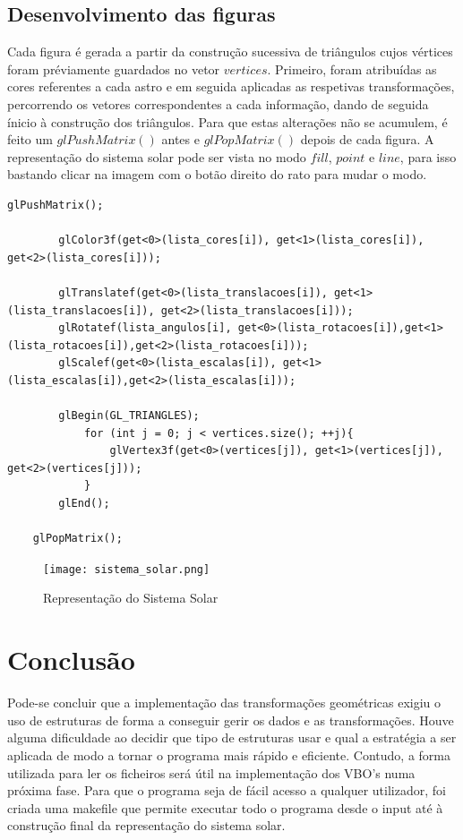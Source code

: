 \documentclass{report}
\begin{document}
\section{Desenvolvimento das figuras}
Cada figura \'e gerada a partir da constru\c{c}\~ao sucessiva de tri\^angulos cujos v\'ertices foram pr\'eviamente guardados no vetor $vertices$. Primeiro, foram atribu\'idas as cores referentes a cada astro e em seguida aplicadas as respetivas transforma\c{c}\~oes, percorrendo os vetores correspondentes a cada informa\c{c}\~ao, dando de seguida \'inicio \`a constru\c{c}\~ao dos tri\^angulos.
Para que estas altera\c{c}\~oes n\~ao se acumulem, \'e feito um $glPushMatrix()$ antes e $glPopMatrix()$ depois de cada figura.
A representa\c{c}\~ao do sistema solar pode ser vista no modo $fill$, $point$ e $line$, para isso bastando clicar na imagem com o bot\~ao direito do rato para mudar o modo. 
\begin{lstlisting}[caption={Consctru\c{c}\~ao das figuras},captionpos=b]
    glPushMatrix();

        glColor3f(get<0>(lista_cores[i]), get<1>(lista_cores[i]), get<2>(lista_cores[i]));
            
        glTranslatef(get<0>(lista_translacoes[i]), get<1>(lista_translacoes[i]), get<2>(lista_translacoes[i]));
        glRotatef(lista_angulos[i], get<0>(lista_rotacoes[i]),get<1>(lista_rotacoes[i]),get<2>(lista_rotacoes[i]));
        glScalef(get<0>(lista_escalas[i]), get<1>(lista_escalas[i]),get<2>(lista_escalas[i]));
        
        glBegin(GL_TRIANGLES);
            for (int j = 0; j < vertices.size(); ++j){
                glVertex3f(get<0>(vertices[j]), get<1>(vertices[j]), get<2>(vertices[j]));
            }
        glEnd();

    glPopMatrix();
\end{lstlisting}

\begin{figure}[h]
\centering
\texttt{[image: sistema\_solar.png]}
\caption{Representa\c{c}\~ao do Sistema Solar}
\end{figure}

\clearpage

\chapter{Conclus\~{a}o}
Pode-se concluir que a implementa\c{c}\~ao das transforma\c{c}\~oes geom\'etricas exigiu o uso de estruturas  de forma a conseguir gerir os dados e as transforma\c{c}\~oes. Houve alguma dificuldade ao decidir que tipo de estruturas usar e qual a estrat\'egia a ser aplicada de modo a tornar o programa mais r\'apido e eficiente. Contudo, a forma utilizada para ler os ficheiros ser\'a \'util na implementa\c{c}\~ao dos VBO's numa pr\'oxima fase.
Para que o programa seja de f\'acil acesso a qualquer utilizador, foi criada uma makefile que permite executar todo o programa desde o input at\'e \`a constru\c{c}\~ao final da representa\c{c}\~ao do sistema solar.
\clearpage
\end{document}
